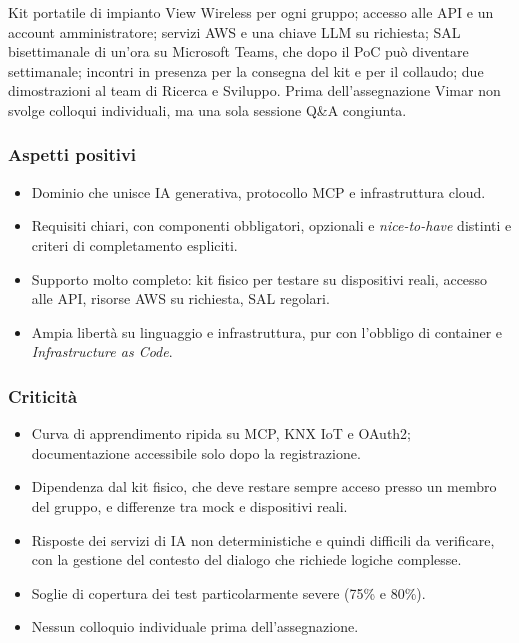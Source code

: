 Kit portatile di impianto View Wireless per ogni gruppo; accesso alle API e un account amministratore; servizi AWS e una chiave LLM su richiesta; SAL bisettimanale di un'ora su Microsoft Teams, che dopo il PoC può diventare settimanale; incontri in presenza per la consegna del kit e per il collaudo; due dimostrazioni al team di Ricerca e Sviluppo. Prima dell'assegnazione Vimar non svolge colloqui individuali, ma una sola sessione Q\&A congiunta.

\subsubsection*{Aspetti positivi}

\begin{itemize}
    \item Dominio che unisce IA generativa, protocollo MCP e infrastruttura cloud.
    \item Requisiti chiari, con componenti obbligatori, opzionali e \emph{nice-to-have} distinti e criteri di completamento espliciti.
    \item Supporto molto completo: kit fisico per testare su dispositivi reali, accesso alle API, risorse AWS su richiesta, SAL regolari.
    \item Ampia libertà su linguaggio e infrastruttura, pur con l'obbligo di container e \emph{Infrastructure as Code}.
\end{itemize}

\subsubsection*{Criticità}

\begin{itemize}
    \item Curva di apprendimento ripida su MCP, KNX IoT e OAuth2; documentazione accessibile solo dopo la registrazione.
    \item Dipendenza dal kit fisico, che deve restare sempre acceso presso un membro del gruppo, e differenze tra mock e dispositivi reali.
    \item Risposte dei servizi di IA non deterministiche e quindi difficili da verificare, con la gestione del contesto del dialogo che richiede logiche complesse.
    \item Soglie di copertura dei test particolarmente severe (75\% e 80\%).
    \item Nessun colloquio individuale prima dell'assegnazione.
\end{itemize}

